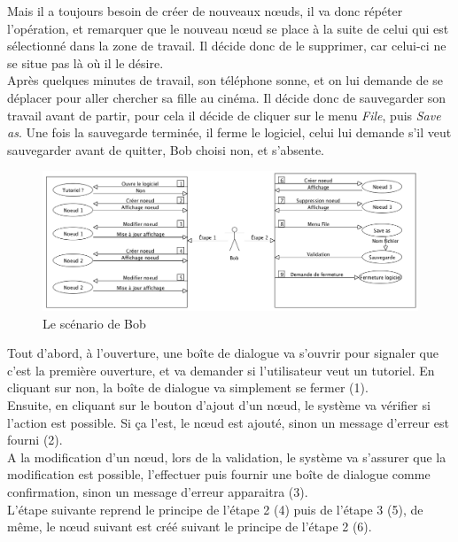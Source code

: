 \documentclass[12pt, a4paper]{article}
\begin{document}
Mais il a toujours besoin de créer de nouveaux nœuds, il va donc répéter l'opération, et remarquer que le nouveau nœud se place à la suite de celui qui est sélectionné dans la zone de travail. Il décide donc de le supprimer, car celui-ci ne se situe pas là où il le désire.\\


Après quelques minutes de travail, son téléphone sonne, et on lui demande de se déplacer pour aller chercher sa fille au cinéma. Il décide donc de sauvegarder son travail avant de partir, pour cela il décide de cliquer sur le menu \emph{File}, puis \emph{Save as}. Une fois la sauvegarde terminée, il ferme le logiciel, celui lui demande s’il veut sauvegarder avant de quitter, Bob choisi non, et s'absente.\\

\newpage
\begin{figure}[h]
\begin{center}
   \includegraphics[scale = 0.4]{scenario-bob.png}
	\caption{Le scénario de Bob}
	\end{center}
\end{figure}

Tout d'abord, à l'ouverture, une boîte de dialogue va s'ouvrir pour signaler que c'est la première ouverture, et va demander si l'utilisateur veut un tutoriel. En cliquant sur non, la boîte de dialogue va simplement se fermer (1).\\ 


Ensuite, en cliquant sur le bouton d'ajout d'un nœud, le système va vérifier si l'action est possible. Si ça l'est, le nœud est ajouté, sinon un message d'erreur est fourni (2).\\ 


A la modification d'un nœud, lors de la validation, le système va s'assurer que la modification est possible, l'effectuer puis fournir une boîte de dialogue comme confirmation, sinon un message d'erreur apparaitra (3).\\  


L'étape suivante reprend le principe de l'étape 2 (4) puis de l'étape 3 (5), de même, le nœud suivant est créé suivant le principe de l'étape 2 (6).\\ 
\end{document}

